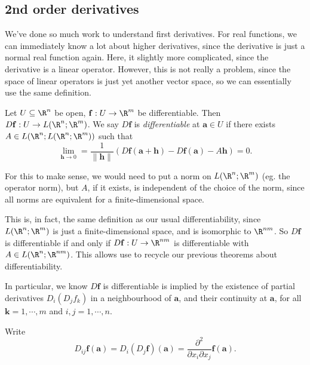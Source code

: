 \documentclass[a4paper]{article}
\begin{document}
\subsection{2nd order derivatives}
We've done so much work to understand first derivatives. For real functions, we can immediately know a lot about higher derivatives, since the derivative is just a normal real function again. Here, it slightly more complicated, since the derivative is a linear operator. However, this is not really a problem, since the space of linear operators is just yet another vector space, so we can essentially use the same definition.

\begin{defi}[2nd derivative]
  Let $U \subseteq \R^n$ be open, $\mathbf{f}: U \to \R^m$ be differentiable. Then $D\mathbf{f}: U \to L(\R^n; \R^m)$. We say $D\mathbf{f}$ is \emph{differentiable} at $\mathbf{a} \in U$ if there exists $A \in L(\R^n; L(\R^n; \R^m))$ such that
  \[
    \lim_{\mathbf{h} \to 0} = \frac{1}{\|\mathbf{h}\|} (D\mathbf{f}(\mathbf{a} + \mathbf{h}) - D \mathbf{f}(\mathbf{a}) - A \mathbf{h}) = 0.
  \]
\end{defi}
For this to make sense, we would need to put a norm on $L(\R^n; \R^m)$ (eg. the operator norm), but $A$, if it exists, is independent of the choice of the norm, since all norms are equivalent for a finite-dimensional space.

This is, in fact, the same definition as our usual differentiability, since $L(\R^n; \R^m)$ is just a finite-dimensional space, and is isomorphic to $\R^{nm}$. So $D\mathbf{f}$ is differentiable if and only if $D\mathbf{f}: U \to \R^{nm}$ is differentiable with $A \in L(\R^n; \R^{nm})$. This allows use to recycle our previous theorems about differentiability.

In particular, we know $D\mathbf{f}$ is differentiable is implied by the existence of partial derivatives $D_i (D_j f_k)$ in a neighbourhood of $\mathbf{a}$, and their continuity at $\mathbf{a}$, for all $\mathbf{k} = 1, \cdots, m$ and $i, j = 1, \cdots, n$.

\begin{notation}
  Write
  \[
    D_{ij} \mathbf{f}(\mathbf{a}) = D_i(D_j \mathbf{f})(\mathbf{a}) = \frac{\partial^2}{\partial x_i \partial x_j} \mathbf{f}(\mathbf{a}).
  \]
\end{notation}
\end{document}
